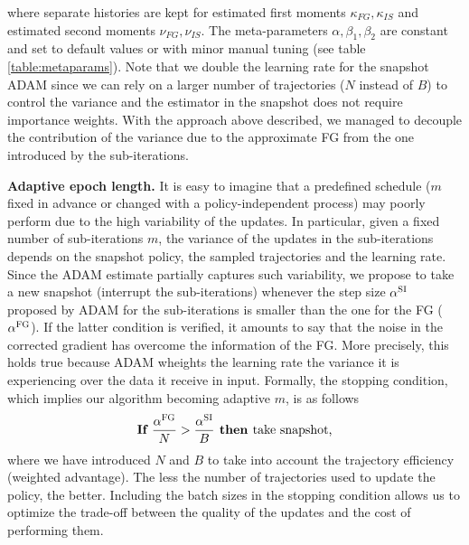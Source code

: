 where separate histories are kept for estimated first moments $\kappa_{FG},\kappa_{IS}$ and estimated second moments $\nu_{FG},\nu_{IS}$.
The meta-parameters $\alpha,\beta_1,\beta_2$ are constant and set to default values or with minor manual tuning (see table \ref{table:metaparams}). Note that we double the learning rate for the snapshot \acs{ADAM} since we can rely on a larger number of trajectories ($N$ instead of $B$) to control the variance and the estimator in the snapshot does not require importance weights. With the approach above described, we managed to decouple the contribution of the variance due to the approximate \acs{FG} from the one introduced by the sub-iterations.\newline

\textbf{Adaptive epoch length.}
It is easy to imagine that a predefined schedule (\eg $m$ fixed in advance or changed with a policy-independent process) may poorly perform due to the high variability of the updates.
In particular, given a fixed number of sub-iterations $m$, the variance of the updates in the sub-iterations depends on the snapshot policy, the sampled trajectories and the learning rate.
Since the \acs{ADAM} estimate partially captures such variability,  we propose to take a new snapshot (\ie interrupt the sub-iterations) whenever the step size $\alpha^{\textsc{SI}}$ proposed by \acs{ADAM} for the sub-iterations is smaller than the one for the \acs{FG} (\ie $\alpha^{\textsc{FG}}$).
If the latter condition is verified, it amounts to say that the noise in the corrected gradient has overcome the information of the \acs{FG}. More precisely, this holds true because \acs{ADAM} wheights the learning rate \wrt the variance it is experiencing over the data it receive in input.
Formally, the stopping condition, which implies our algorithm becoming adaptive \wrt $m$, is as follows
\[
\textbf{If }        \frac{\alpha^{\textsc{FG}}}{N} > \frac{\alpha^{\textsc{SI}}}{B} \textbf{ then } \text{take snapshot,}
\]
where we have introduced $N$ and $B$ to take into account the trajectory efficiency (\ie weighted advantage).
The less the number of trajectories used to update the policy, the better.
Including the batch sizes in the stopping condition allows us to optimize the trade-off between the quality of the updates and the cost of performing them.

\vspace{-0.05in}
